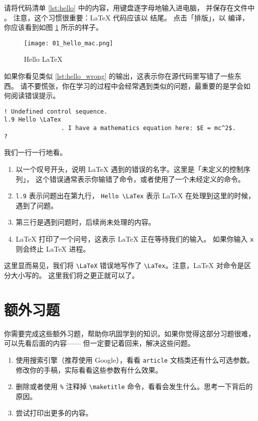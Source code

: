 请将代码清单 \ref{lst:hello} 中的内容，用键盘逐字母地输入进电脑，
并保存在文件中 。
注意，这个习惯很重要：\LaTeX{} 代码应该以  结尾。
点击「排版」，以 \XeLaTeX{} 编译，你应该看到如图 \ref{fig:hello} 所示的样子。

\begin{figure}[!htb]
\centering
\texttt{[image: 01\_hello\_mac.png]}
\caption{Hello \LaTeX{}}\label{fig:hello}
\end{figure}

如果你看见类似 \ref{lst:hello_wrong} 的输出，这表示你在源代码里写错了一些东西。
请不要慌张，你在学习的过程中会经常遇到类似的问题，最重要的是学会如何阅读错误提示。

\begin{lstlisting}[style = lltx, caption = {错误输出}, label = {lst:hello_wrong}]
! Undefined control sequence.
l.9 Hello \LaTex
                . I have a mathematics equation here: $E = mc^2$.
?
\end{lstlisting}

我们一行一行地看。

\begin{enumerate}
  \item 以一个叹号开头，说明 \LaTeX{} 遇到的错误的名字。这里是「未定义的控制序列」，
  这个错误通常表示你输错了命令，或者使用了一个未经定义的命令。
  \item \lstinline[style = iltx]|l.9| 表示问题出在第九行，
  \lstinline[style = iltx]|Hello \LaTex| 表示 \LaTeX{}
  在处理到这里的时候，遇到了问题。
  \item 第三行是遇到问题时，后续尚未处理的内容。
  \item \LaTeX{} 打印了一个问号，这表示 \LaTeX{} 正在等待我们的输入。
  如果你输入 \lstinline[style = iltx]|x| 则会终止 \LaTeX{} 进程。
\end{enumerate}

这里显而易见，我们将 \lstinline[style = iltx]|\LaTeX| 错误地写作了
\lstinline[style = iltx]|\LaTex|。注意，\LaTeX{} 对命令是区分大小写的。
这里我们将之更正就可以了。

\section{额外习题}

你需要完成这些额外习题，帮助你巩固学到的知识。如果你觉得这部分习题很难，可以先看后面的内容——
但一定要记着回来，解决这些问题。

\begin{enumerate}
  \item 使用搜索引擎（推荐使用 Google），看看 \lstinline[style = iltx]|article|
  文档类还有什么可选参数。修改你的手稿，实际看看这些参数有什么效果。
  \item 删除或者使用 \lstinline[style = iltx]|%| 注释掉
  \lstinline[style = iltx]|\maketitle| 命令，看看会发生什么。思考一下背后的原因。
  \item 尝试打印出更多的内容。
\end{enumerate}

\endinput
